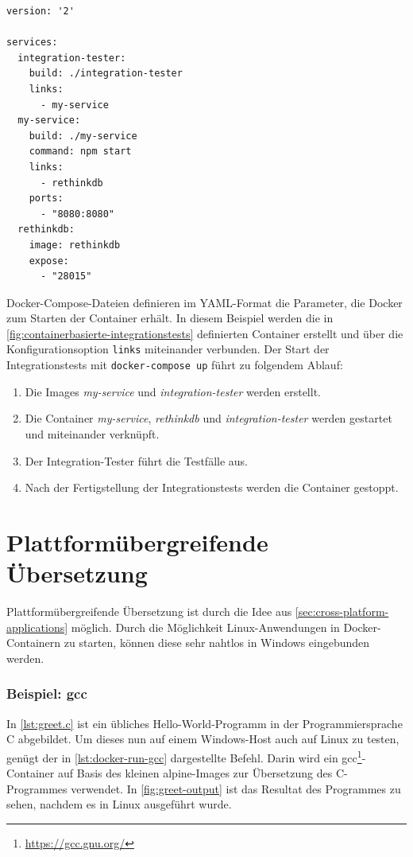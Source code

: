 \begin{lstlisting}[caption=Servicedefinition zum Integrationstesten (docker-compose-yml), label=lst:docker-compose-integrationstests]
version: '2'

services:
  integration-tester:
    build: ./integration-tester
    links:
      - my-service
  my-service:
    build: ./my-service
    command: npm start
    links:
      - rethinkdb
    ports:
      - "8080:8080"
  rethinkdb:
    image: rethinkdb
    expose:
      - "28015"
\end{lstlisting}
Docker-Compose-Dateien definieren im YAML-Format die Parameter, die Docker zum Starten der Container erhält.
In diesem Beispiel werden die in \cref{fig:containerbasierte-integrationstests} definierten Container erstellt und über die Konfigurationsoption \texttt{links} miteinander verbunden.
Der Start der Integrationstests mit \texttt{docker-compose up} führt zu folgendem Ablauf:
\begin{enumerate}
    \item Die Images \emph{my-service} und \emph{integration-tester} werden erstellt.
    \item Die Container \emph{my-service}, \emph{rethinkdb} und \emph{integration-tester} werden gestartet und miteinander verknüpft.
    \item Der Integration-Tester führt die Testfälle aus.
    \item Nach der Fertigstellung der Integrationstests werden die Container gestoppt.
\end{enumerate}

\section{Plattformübergreifende Übersetzung}
\label{sec:plattformuebergreifende-uebersetzung}
Plattformübergreifende Übersetzung ist durch die Idee aus \cref{sec:cross-platform-applications} möglich.
Durch die Möglichkeit Linux-Anwendungen in Docker-Containern zu starten, können diese sehr nahtlos in Windows eingebunden werden.

\subsubsection{Beispiel: gcc}
In \cref{lst:greet.c} ist ein übliches Hello-World-Programm in der Programmiersprache C abgebildet.
Um dieses nun auf einem Windows-Host auch auf Linux zu testen, genügt der in \cref{lst:docker-run-gcc} dargestellte Befehl.
Darin wird ein gcc\footnote{\url{https://gcc.gnu.org/}}-Container auf Basis des kleinen alpine-Images zur Übersetzung des C-Programmes verwendet.
In \cref{fig:greet-output} ist das Resultat des Programmes zu sehen, nachdem es in Linux ausgeführt wurde.

